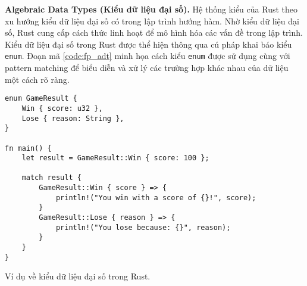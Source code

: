 
\textbf{Algebraic Data Types (Kiểu dữ liệu đại số).} Hệ thống kiểu của Rust theo xu hướng kiểu dữ liệu đại số có trong lập trình hướng hàm.
Nhờ kiểu dữ liệu đại số, Rust cung cấp cách thức linh hoạt để mô hình hóa các vấn đề trong lập trình.
Kiểu dữ liệu đại số trong Rust được thể hiện thông qua cú pháp khai báo kiểu \texttt{enum}.
Đoạn mã \ref{code:fp_adt} minh họa cách kiểu \texttt{enum} được sử dụng cùng với pattern matching để biểu diễn và xử lý các trường hợp khác nhau của dữ liệu một cách rõ ràng.

\begin{listing}[H]
\begin{verbatim}
enum GameResult {
    Win { score: u32 },
    Lose { reason: String },
}

fn main() {
    let result = GameResult::Win { score: 100 };

    match result {
        GameResult::Win { score } => {
            println!("You win with a score of {}!", score);
        }
        GameResult::Lose { reason } => {
            println!("You lose because: {}", reason);
        }
    }
}
\end{verbatim}
\caption{Ví dụ về kiểu dữ liệu đại số trong Rust.}
\label{code:fp_adt}
\end{listing}

